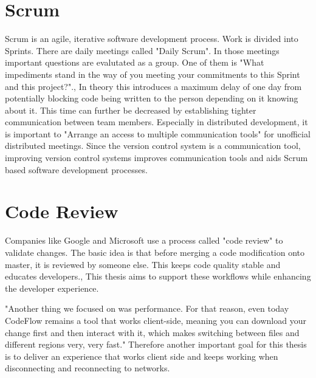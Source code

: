 \section{Scrum}
Scrum is an agile, iterative software development process. Work is divided into Sprints. There are daily meetings called "Daily Scrum". In those meetings important questions are evalutated as a group. One of them is "What impediments stand in the way of you meeting your commitments to this Sprint and this project?".\cite{schwaber2004agile},\cite{10.1007/978-1-4471-0947-1_11}
In theory this introduces a maximum delay of one day from potentially blocking code being written to the person depending on it knowing about it. This time can further be decreased by establishing tighter communication between team members.
Especially in distributed development, it is important to "Arrange an access to multiple communication tools"\cite{5196933} for unofficial distributed meetings.\cite{4638656}
Since the version control system is a communication tool, improving version control systems improves communication tools and aids Scrum based software development processes.

\section{Code Review}

Companies like Google and Microsoft use a process called "code review" to validate changes. The basic idea is that before merging a code modification onto master, it is reviewed by someone else. This keeps code quality stable and educates developers.\cite{SadowskiSoederbergChurchSipkoBacchelli:2018:Moderncodereview:acasestudyatgoogle},\cite{Bacchelli:2013:EOC:2486788.2486882} This thesis aims to support these workflows while enhancing the developer experience. 

"Another thing we focused on was performance. For that
reason, even today CodeFlow remains a tool that works
client-side, meaning you can download your change first
and then interact with it, which makes switching between
files and different regions very, very fast."\cite{CzerwonkaGreilerBirdPanjerCoatta:2018:CodeFlow:ImprovingtheCodeReviewProcessatMicrosoft} Therefore another important goal for this thesis is to deliver an experience that works client side and keeps working when disconnecting and reconnecting to networks.